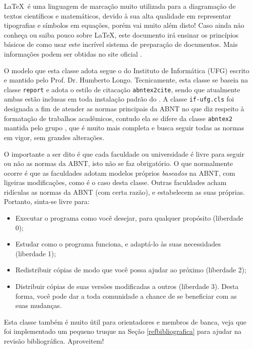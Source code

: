\LaTeX\ é uma linguagem de marcação muito utilizada para a diagramação de textos científicos e matemáticos, devido à sua alta qualidade em representar tipografias e símbolos em equações, porém vai muito além disto! Caso ainda não conheça ou saiba pouco sobre \LaTeX, este documento  irá ensinar os princípios básicos de como usar este incrível sistema de preparação de documentos. Mais informações podem ser obtidas no site oficial .

O modelo que esta classe adota segue o do Instituto de Informática (UFG) escrito e mantido pelo Prof. Dr. Humberto Longo. Tecnicamente,
esta classe se baseia na classe \texttt{report} e adota o estilo de citacação \texttt{abntex2cite}, sendo que atualmente ambas estão inclusas em toda instalação padrão do . A classe \texttt{if-ufg.cls} foi designada a fim de atender as normas principais da ABNT no que diz respeito à formatação de trabalhos acadêmicos, contudo ela se difere da classe \texttt{abntex2} mantida pelo grupo , que é muito mais completa e busca seguir todas as normas em vigor, sem grandes alterações.

O importante a ser dito é que cada faculdade ou universidade é livre para seguir ou não as normas da ABNT, isto não se faz obrigatório. O que normalmente ocorre é que as faculdades adotam modelos próprios \emph{baseados} na ABNT, com ligeiras modificações, como é o caso desta classe. Outras faculdades acham ridículas as normas da ABNT (com certa razão), e estabelecem as suas próprias. Portanto, sinta-se livre para:

\begin{itemize}
\item Executar o programa como você desejar, para qualquer propósito (liberdade 0);
\item Estudar como o programa funciona, e adaptá-lo às suas necessidades (liberdade 1);
\item Redistribuir cópias de modo que você possa ajudar ao próximo (liberdade 2);
\item Distribuir cópias de suas versões modificadas a outros (liberdade 3). Desta forma, você pode dar a toda comunidade a chance de se beneficiar com as suas mudanças.
\end{itemize}

Esta classe também é muito útil para orientadores e membros de banca, veja que foi implementado um pequeno truque na Seção \ref{refbibliografica} para ajudar na revisão bibliográfica. Aproveitem!

